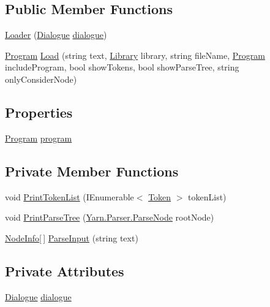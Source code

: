 \subsection*{Public Member Functions}
\begin{DoxyCompactItemize}
\item 
\hyperlink{a00051_a1972fc413e1679ecbe91eef536ca8479}{Loader} (\hyperlink{a00036}{Dialogue} \hyperlink{a00051_a89d1f29eba1c52c96c62a4cfe7859a1d}{dialogue})
\item 
\hyperlink{a00067}{Program} \hyperlink{a00051_ab6044e0d99dd4e6961ae7daaf1532c99}{Load} (string text, \hyperlink{a00049}{Library} library, string file\-Name, \hyperlink{a00067}{Program} include\-Program, bool show\-Tokens, bool show\-Parse\-Tree, string only\-Consider\-Node)
\end{DoxyCompactItemize}
\subsection*{Properties}
\begin{DoxyCompactItemize}
\item 
\hyperlink{a00067}{Program} \hyperlink{a00051_a6d8296076823c0c082df9024367f4860}{program}
\end{DoxyCompactItemize}
\subsection*{Private Member Functions}
\begin{DoxyCompactItemize}
\item 
void \hyperlink{a00051_a9321fce224021841ce6f70ca7fbe531b}{Print\-Token\-List} (I\-Enumerable$<$ \hyperlink{a00079}{Token} $>$ token\-List)
\item 
void \hyperlink{a00051_aa105ea8e5d65a420d1089616523feecc}{Print\-Parse\-Tree} (\hyperlink{a00063}{Yarn.\-Parser.\-Parse\-Node} root\-Node)
\item 
\hyperlink{a00056}{Node\-Info}\mbox{[}$\,$\mbox{]} \hyperlink{a00051_a2f635405d2b624ac67a27da0787a3524}{Parse\-Input} (string text)
\end{DoxyCompactItemize}
\subsection*{Private Attributes}
\begin{DoxyCompactItemize}
\item 
\hyperlink{a00036}{Dialogue} \hyperlink{a00051_a89d1f29eba1c52c96c62a4cfe7859a1d}{dialogue}
\end{DoxyCompactItemize}


